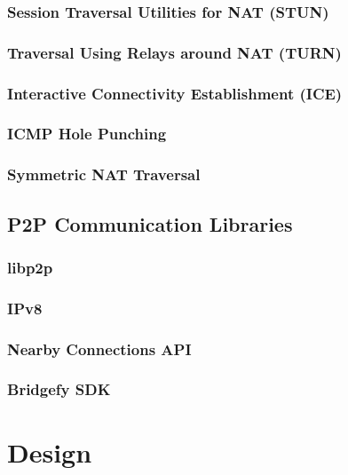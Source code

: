 \subsection{Session Traversal Utilities for NAT (STUN)}

\subsection{Traversal Using Relays around NAT (TURN)}

\subsection{Interactive Connectivity Establishment (ICE)}

\subsection{ICMP Hole Punching}

\subsection{Symmetric NAT Traversal}

\section{P2P Communication Libraries}

\subsection{libp2p}

\subsection{IPv8}

\subsection{Nearby Connections API}

\subsection{Bridgefy SDK}


\chapter{Design}

